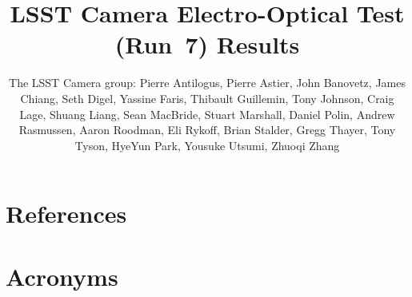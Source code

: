 \documentclass[SE,lsstdraft,authoryear,toc]{lsstdoc}
\title{LSST Camera Electro-Optical Test (Run~7) Results}
\author{%
The LSST Camera group:
Pierre Antilogus,
Pierre Astier,
John Banovetz,
James Chiang,
Seth Digel,
Yassine Faris,
Thibault Guillemin,
Tony Johnson,
Craig Lage,
Shuang Liang,
Sean MacBride,
Stuart Marshall,
Daniel Polin,
Andrew Rasmussen,
Aaron Roodman,
Eli Rykoff,
Brian Stalder,
Gregg Thayer,
Tony Tyson,
HyeYun Park,
Yousuke Utsumi,
Zhuoqi Zhang
}
\date{\vcsDate}
\begin{document}
\maketitle















\appendix

\clearpage

\section{References} \label{sec:bib}
\renewcommand{\refname}{} %

\clearpage

\section{Acronyms} \label{sec:acronyms}

\end{document}
